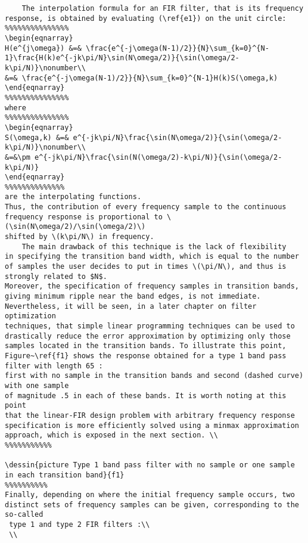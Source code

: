 {\begin{verbatim}
	The interpolation formula for an FIR filter, that is its frequency response, is obtained by evaluating (\ref{e1}) on the unit circle:
%%%%%%%%%%%%%%%
\begin{eqnarray}
H(e^{j\omega}) &=& \frac{e^{-j\omega(N-1)/2}}{N}\sum_{k=0}^{N-1}\frac{H(k)e^{-jk\pi/N}\sin(N\omega/2)}{\sin(\omega/2-k\pi/N)}\nonumber\\
&=& \frac{e^{-j\omega(N-1)/2}}{N}\sum_{k=0}^{N-1}H(k)S(\omega,k)
\end{eqnarray}
%%%%%%%%%%%%%%%
where
%%%%%%%%%%%%%%%
\begin{eqnarray}
S(\omega,k) &=& e^{-jk\pi/N}\frac{\sin(N\omega/2)}{\sin(\omega/2-k\pi/N)}\nonumber\\
&=&\pm e^{-jk\pi/N}\frac{\sin(N(\omega/2)-k\pi/N)}{\sin(\omega/2-k\pi/N)}
\end{eqnarray}
%%%%%%%%%%%%%%
are the interpolating functions.
Thus, the contribution of every frequency sample to the continuous
frequency response is proportional to \(\sin(N\omega/2)/\sin(\omega/2)\) 
shifted by \(k\pi/N\) in frequency.
	The main drawback of this technique is the lack of flexibility
in specifying the transition band width, which is equal to the number of samples the user decides to put in times \(\pi/N\), and thus is 
strongly related to $N$.
Moreover, the specification of frequency samples in transition bands, giving minimum ripple near the band edges, is not immediate.
Nevertheless, it will be seen, in a later chapter on filter optimization
techniques, that simple linear programming techniques can be used to drastically reduce the error approximation by optimizing only those samples located in the transition bands. To illustrate this point, Figure~\ref{f1} shows the response obtained for a type 1 band pass filter with length 65 : 
first with no sample in the transition bands and second (dashed curve) with one sample 
of magnitude .5 in each of these bands. It is worth noting at this point 
that the linear-FIR design problem with arbitrary frequency response 
specification is more efficiently solved using a minmax approximation 
approach, which is exposed in the next section. \\
%%%%%%%%%%%

\dessin{picture Type 1 band pass filter with no sample or one sample in each transition band}{f1}
%%%%%%%%%%
Finally, depending on where the initial frequency sample occurs, two distinct sets of frequency samples can be given, corresponding to the so-called
 type 1 and type 2 FIR filters :\\
 \\

\end{verbatim}}
